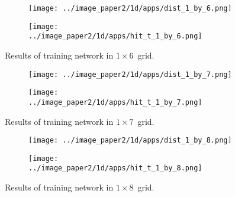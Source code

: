 {    \begin{figure}
        \begin{subfigure}[b]{0.5\textwidth}
            \centering
            \texttt{[image: ../image\_paper2/1d/apps/dist\_1\_by\_6.png]}
        \end{subfigure}
        \hfill
        \begin{subfigure}[b]{0.5\textwidth}
             \texttt{[image: ../image\_paper2/1d/apps/hit\_t\_1\_by\_6.png]}
        \end{subfigure}
                \caption{Results of training network in $1\times6$~grid.}
         \label{fig: 1by6T}
    \end{figure}
    
    \begin{figure}
        \begin{subfigure}[b]{0.5\textwidth}
            \centering
            \texttt{[image: ../image\_paper2/1d/apps/dist\_1\_by\_7.png]}
        \end{subfigure}
        \hfill
        \begin{subfigure}[b]{0.5\textwidth}
             \texttt{[image: ../image\_paper2/1d/apps/hit\_t\_1\_by\_7.png]}
        \end{subfigure}
                \caption{Results of training network in $1\times7$~grid.}
         \label{fig: 1by7T}
    \end{figure}
    
    \begin{figure}
        \begin{subfigure}[b]{0.5\textwidth}
            \centering
            \texttt{[image: ../image\_paper2/1d/apps/dist\_1\_by\_8.png]}
        \end{subfigure}
        \hfill
        \begin{subfigure}[b]{0.5\textwidth}
             \texttt{[image: ../image\_paper2/1d/apps/hit\_t\_1\_by\_8.png]}
        \end{subfigure}
                \caption{Results of training network in $1\times8$~grid.}
         \label{fig: 1by8T}
    \end{figure}
    
}
